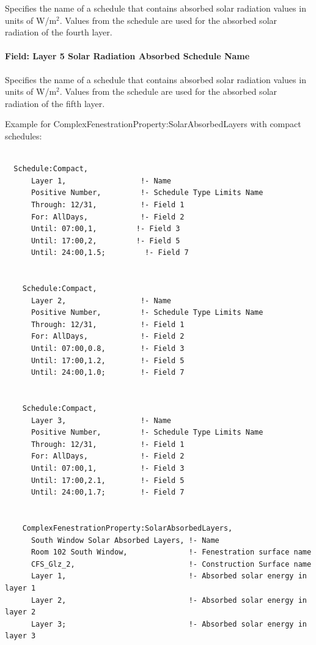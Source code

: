 Specifies the name of a schedule that contains absorbed solar radiation values in units of W/m\(^{2}\). Values from the schedule are used for the absorbed solar radiation of the fourth layer.

\paragraph{Field: Layer 5 Solar Radiation Absorbed Schedule Name}\label{field-layer-5-solar-radiation-absorbed-schedule-name}

Specifies the name of a schedule that contains absorbed solar radiation values in units of W/m\(^{2}\). Values from the schedule are used for the absorbed solar radiation of the fifth layer.

Example for ComplexFenestrationProperty:SolarAbsorbedLayers with compact schedules:

\begin{lstlisting}

  Schedule:Compact,
      Layer 1,                 !- Name
      Positive Number,         !- Schedule Type Limits Name
      Through: 12/31,          !- Field 1
      For: AllDays,            !- Field 2
      Until: 07:00,1,         !- Field 3
      Until: 17:00,2,         !- Field 5
      Until: 24:00,1.5;         !- Field 7


    Schedule:Compact,
      Layer 2,                 !- Name
      Positive Number,         !- Schedule Type Limits Name
      Through: 12/31,          !- Field 1
      For: AllDays,            !- Field 2
      Until: 07:00,0.8,        !- Field 3
      Until: 17:00,1.2,        !- Field 5
      Until: 24:00,1.0;        !- Field 7


    Schedule:Compact,
      Layer 3,                 !- Name
      Positive Number,         !- Schedule Type Limits Name
      Through: 12/31,          !- Field 1
      For: AllDays,            !- Field 2
      Until: 07:00,1,          !- Field 3
      Until: 17:00,2.1,        !- Field 5
      Until: 24:00,1.7;        !- Field 7


    ComplexFenestrationProperty:SolarAbsorbedLayers,
      South Window Solar Absorbed Layers, !- Name
      Room 102 South Window,              !- Fenestration surface name
      CFS_Glz_2,                          !- Construction Surface name
      Layer 1,                            !- Absorbed solar energy in layer 1
      Layer 2,                            !- Absorbed solar energy in layer 2
      Layer 3;                            !- Absorbed solar energy in layer 3
\end{lstlisting}

